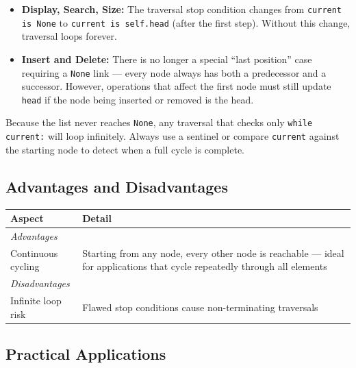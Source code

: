 \documentclass[11pt, a4paper, notitlepage]{report}
\theoremstyle{definition}
\theoremstyle{remark}
\theoremstyle{definition}
\begin{document}
\begin{itemize}
  \item \textbf{Display, Search, Size:} The traversal stop condition changes
        from \texttt{current is None} to \texttt{current is self.head}
        (after the first step). Without this change, traversal loops forever.
  \item \textbf{Insert and Delete:} There is no longer a special ``last
        position'' case requiring a \texttt{None} link --- every node always
        has both a predecessor and a successor. However, operations that affect
        the first node must still update \texttt{head} if the node being
        inserted or removed is the head.
\end{itemize}

\begin{warning}[title={Warning: Infinite Loop Risk}]
Because the list never reaches \texttt{None}, any traversal that checks only
\texttt{while current:} will loop infinitely. Always use a sentinel or compare
\texttt{current} against the starting node to detect when a full cycle is
complete.
\end{warning}

\subsection{Advantages and Disadvantages}
\label{subsec:circular-pros-cons}

\begin{center}
\begin{tabularx}{\linewidth}{lX}
\toprule
\textbf{Aspect} & \textbf{Detail} \\
\midrule
\multicolumn{2}{l}{\textit{Advantages}} \\
Continuous cycling & Starting from any node, every other node is reachable ---
                     ideal for applications that cycle repeatedly through all
                     elements \\
\midrule
\multicolumn{2}{l}{\textit{Disadvantages}} \\
Infinite loop risk & Flawed stop conditions cause non-terminating traversals \\
\bottomrule
\end{tabularx}
\end{center}

\subsection{Practical Applications}
\label{subsec:circular-applications}
\end{document}
